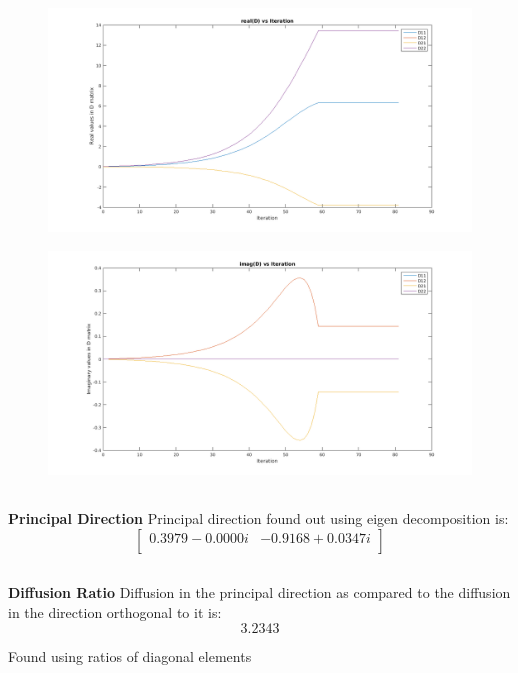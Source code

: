 \documentclass[11pt]{article}
\begin{document}
\begin{figure}[h]
\centering
\includegraphics[scale=0.5]{reald}
\end{figure}

\begin{figure}[h]
\centering
\includegraphics[scale=0.5]{imagd}
\end{figure}

\FloatBarrier
\subsection{}
\hfill \break
\textbf{Principal Direction}
Principal direction found out using eigen decomposition is:
\[\begin{bmatrix}
0.3979 - 0.0000i & -0.9168 + 0.0347i\\
\end{bmatrix}\]

\subsection{}
\hfill \break
\textbf{Diffusion Ratio}
Diffusion in the principal direction as compared to the diffusion in the direction orthogonal to it is:
$$3.2343$$

Found using ratios of diagonal elements
\end{document}
